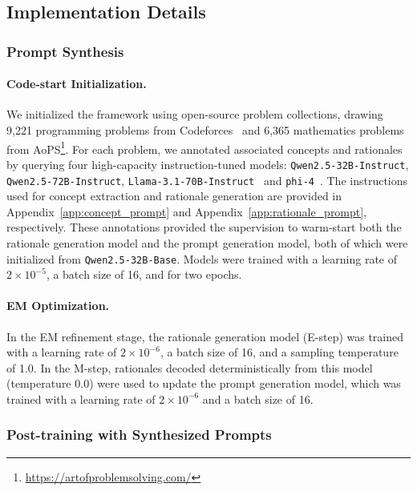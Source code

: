 \subsection{Implementation Details}

\subsubsection{Prompt Synthesis}

\paragraph{Code-start Initialization.} 
We initialized the framework using open-source problem collections, drawing 9,221 programming problems from Codeforces~\citep{penedo2025codeforces} and 6,365 mathematics problems from AoPS\footnote{\url{https://artofproblemsolving.com/}}. 
For each problem, we annotated associated concepts and rationales by querying four high-capacity instruction-tuned models: \texttt{Qwen2.5-32B-Instruct}, \texttt{Qwen2.5-72B-Instruct}, \texttt{Llama-3.1-70B-Instruct}~\citep{grattafiori2024llama} and \texttt{phi-4}~\citep{abdin2024phi}. 
The instructions used for concept extraction and rationale generation are provided in Appendix~\ref{app:concept_prompt} and Appendix~\ref{app:rationale_prompt}, respectively.
These annotations provided the supervision to warm-start both the rationale generation model and the prompt generation model, both of which were initialized from \texttt{Qwen2.5-32B-Base}. 
Models were trained with a learning rate of $2 \times 10^{-5}$, a batch size of 16, and for two epochs. 



\paragraph{EM Optimization.} 
In the EM refinement stage, the rationale generation model (E-step) was trained with a learning rate of $2 \times 10^{-6}$, a batch size of 16, and a sampling temperature of 1.0.  
In the M-step, rationales decoded deterministically from this model (temperature 0.0) were used to update the prompt generation model, which was trained with a learning rate of $2 \times 10^{-6}$ and a batch size of 16.  


\subsubsection{Post-training with Synthesized Prompts}
\label{sec:details_post_train}
